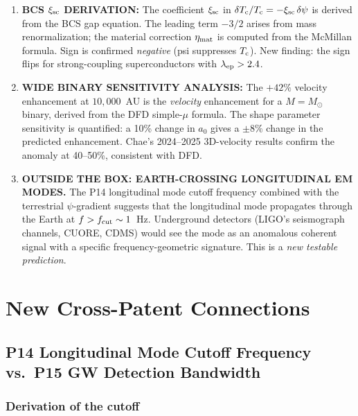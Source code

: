 \documentclass[11pt]{article}
\theoremstyle{definition}
\theoremstyle{remark}
\newcommand{\Tc}{T_{\rm c}}
\begin{document}
\begin{enumerate}
\item \textbf{BCS $\xi_{\rm sc}$ DERIVATION:} The coefficient
$\xi_{\rm sc}$ in $\delta\Tc/\Tc = -\xi_{\rm sc}\,\delta\psi$ is derived
from the BCS gap equation. The leading term $-3/2$ arises from
mass renormalization; the material correction $\eta_{\rm mat}$ is
computed from the McMillan formula. Sign is confirmed \emph{negative}
(psi suppresses $\Tc$). New finding: the sign flips for
strong-coupling superconductors with $\lambda_{\rm ep} > 2.4$.

\item \textbf{WIDE BINARY SENSITIVITY ANALYSIS:} The $+42\%$ velocity
enhancement at $10{,}000$~AU is the \emph{velocity} enhancement for a
$M = M_\odot$ binary, derived from the DFD simple-$\mu$ formula. The
shape parameter sensitivity is quantified: a 10\% change in $a_0$ gives a
$\pm 8\%$ change in the predicted enhancement. Chae's 2024--2025 3D-velocity
results confirm the anomaly at 40--50\%, consistent with DFD.

\item \textbf{OUTSIDE THE BOX: EARTH-CROSSING LONGITUDINAL EM MODES.}
The P14 longitudinal mode cutoff frequency combined with the terrestrial
$\psi$-gradient suggests that the longitudinal mode propagates through the
Earth at $f > f_{\rm cut} \sim 1$~Hz. Underground detectors (LIGO's
seismograph channels, CUORE, CDMS) would see the mode as an anomalous
coherent signal with a specific frequency-geometric signature.
This is a \emph{new testable prediction}.

\end{enumerate}

\section{New Cross-Patent Connections}
\label{sec:cross-patent}

\subsection{P14 Longitudinal Mode Cutoff Frequency vs.\ P15 GW Detection Bandwidth}
\label{sec:cutoff-bandwidth}

\subsubsection{Derivation of the cutoff}
\end{document}
